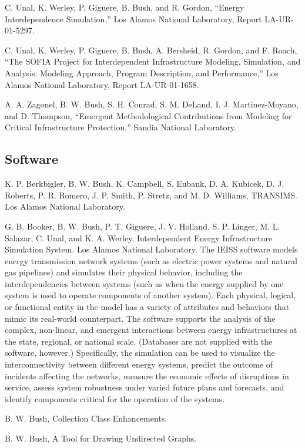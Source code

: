 \documentclass[]{article}
\begin{document}
C. Unal, K. Werley, P. Giguere, B. Bush, and R. Gordon, ``Energy
Interdependence Simulation,'' Los Alamos National Laboratory, Report
LA-UR-01-5297.

C. Unal, K. Werley, P. Giguere, B. Bush, A. Bersheid, R. Gordon, and F.
Roach, ``The SOFIA Project for Interdependent Infrastructure Modeling,
Simulation, and Analysis: Modeling Approach, Program Description, and
Performance,'' Los Alamos National Laboratory, Report LA-UR-01-1658.

A. A. Zagonel, B. W. Bush, S. H. Conrad, S. M. DeLand, I. J.
Martinez-Moyano, and D. Thompson, ``Emergent Methodological
Contributions from Modeling for Critical Infrastructure Protection,''
Sandia National Laboratory.

\subsection{Software}\label{software}

K. P. Berkbigler, B. W. Bush, K. Campbell, S. Eubank, D. A. Kubicek, D.
J. Roberts, P. R. Romero, J. P. Smith, P. Stretz, and M. D. Williams,
TRANSIMS. Los Alamos National Laboratory.

G. B. Booker, B. W. Bush, P. T. Giguere, J. V. Holland, S. P. Linger, M.
L. Salazar, C. Unal, and K. A. Werley, Interdependent Energy
Infrastructure Simulation System. Los Alamos National Laboratory. The
IEISS software models energy transmission network systems (such as
electric power systems and natural gas pipelines) and simulates their
physical behavior, including the interdependencies between systems (such
as when the energy supplied by one system is used to operate components
of another system). Each physical, logical, or functional entity in the
model has a variety of attributes and behaviors that mimic its
real-world counterpart. The software supports the analysis of the
complex, non-linear, and emergent interactions between energy
infrastructures at the state, regional, or national scale. (Databases
are not supplied with the software, however.) Specifically, the
simulation can be used to visualize the interconnectivity between
different energy systems, predict the outcome of incidents affecting the
networks, measure the economic effects of disruptions in service, assess
system robustness under varied future plans and forecasts, and identify
components critical for the operation of the systems.

B. W. Bush, Collection Class Enhancements.

B. W. Bush, A Tool for Drawing Undirected Graphs.
\end{document}
